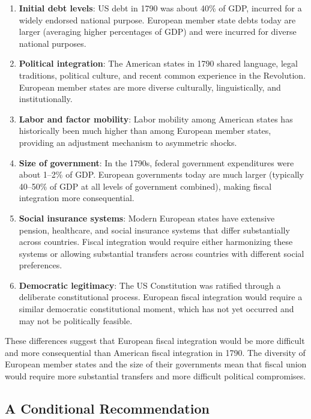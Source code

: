 \documentclass[12pt]{article}
\begin{document}
\begin{enumerate}
\item \textbf{Initial debt levels}: US debt in 1790 was about 40\% of GDP, incurred for a widely endorsed national purpose. European member state debts today are larger (averaging higher percentages of GDP) and were incurred for diverse national purposes.

\item \textbf{Political integration}: The American states in 1790 shared language, legal traditions, political culture, and recent common experience in the Revolution. European member states are more diverse culturally, linguistically, and institutionally.

\item \textbf{Labor and factor mobility}: Labor mobility among American states has historically been much higher than among European member states, providing an adjustment mechanism to asymmetric shocks.

\item \textbf{Size of government}: In the 1790s, federal government expenditures were about 1--2\% of GDP. European governments today are much larger (typically 40--50\% of GDP at all levels of government combined), making fiscal integration more consequential.

\item \textbf{Social insurance systems}: Modern European states have extensive pension, healthcare, and social insurance systems that differ substantially across countries. Fiscal integration would require either harmonizing these systems or allowing substantial transfers across countries with different social preferences.

\item \textbf{Democratic legitimacy}: The US Constitution was ratified through a deliberate constitutional process. European fiscal integration would require a similar democratic constitutional moment, which has not yet occurred and may not be politically feasible.
\end{enumerate}

These differences suggest that European fiscal integration would be more difficult and more consequential than American fiscal integration in 1790. The diversity of European member states and the size of their governments mean that fiscal union would require more substantial transfers and more difficult political compromises.

\subsection{A Conditional Recommendation}
\end{document}
